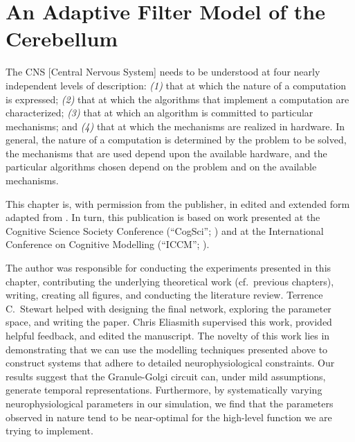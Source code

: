 
\chapter{An Adaptive Filter Model of the Cerebellum}
\label{chp:cerebellum}

\vspace{5pt}

\begin{OpeningQuote}
The CNS [Central Nervous System] needs to be understood at four nearly independent levels of description: \emph{(1)} that at which the nature of a computation is expressed; \emph{(2)} that at which the algorithms that implement a computation are characterized; \emph{(3)} that at which an algorithm is committed to particular mechanisms; and \emph{(4)} that at which the mechanisms are realized in hardware.
In general, the nature of a computation is determined by the problem to be solved, the mechanisms that are used depend upon the available hardware, and the particular algorithms chosen depend on the problem and on the available mechanisms.
\end{OpeningQuote}

\begin{PriorPublication}
This chapter is, with permission from the publisher, in edited and extended form adapted from \citet{stockel2021connecting}.
In turn, this publication is based on work presented at the Cognitive Science Society Conference (\enquote{CogSci}; \cite{stockel2020biologically}) and at the International Conference on Cognitive Modelling (\enquote{ICCM}; \cite{stockel2020connecting}).
\end{PriorPublication}

\begin{Contributions}
The author was responsible for conducting the experiments presented in this chapter, contributing the underlying theoretical work (cf.~previous chapters), writing, creating all figures, and conducting the literature review.
Terrence C.~Stewart helped with designing the final network, exploring the parameter space, and writing the paper.
Chris Eliasmith supervised this work, provided helpful feedback, and edited the manuscript.
The novelty of this work lies in demonstrating that we can use the modelling techniques presented above to construct systems that adhere to detailed neurophysiological constraints.
Our results suggest that the Granule-Golgi circuit can, under mild assumptions, generate temporal representations.
Furthermore, by systematically varying neurophysiological parameters in our simulation, we find that the parameters observed in nature tend to be near-optimal for the high-level function we are trying to implement.
\end{Contributions}

